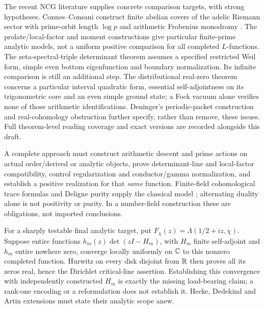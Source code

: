 The recent NCG literature supplies concrete comparison targets, with strong hypotheses. Connes--Consani construct finite abelian covers of the adelic Riemann sector with prime-orbit length $\log p$ and arithmetic Frobenius monodromy \cite[Theorem3.12]{ConnesConsaniKnots}. The prolate/local-factor and moment constructions \cite{Prolate,LocalMoments} give particular finite-prime analytic models, not a uniform positive comparison for all completed $L$-functions. The zeta-spectral-triple determinant theorem \cite[Theorem5.10]{ZetaTriples} assumes a specified restricted Weil form, simple even bottom eigenfunction and boundary normalization. Its infinite comparison is still an additional step. The distributional real-zero theorem \cite[Theorem6.1]{QuadraticForms} concerns a particular interval quadratic form, essential self-adjointness on its trigonometric core and an even simple ground state; a Fock vacuum alone verifies none of those arithmetic identifications. Deninger's periodic-packet construction and real-cohomology obstruction \cite{DeningerPackets,DeningerReal} further specify, rather than remove, these issues. Full theorem-level reading coverage and exact versions are recorded alongside this draft.

A complete approach must construct arithmetic descent and prime actions on actual order/derived or analytic objects, prove determinant-line and local-factor compatibility, control regularization and conductor/gamma normalization, and establish a positive realization for that \emph{same} function. Finite-field cohomological trace formulas and Deligne purity supply the classical model \cite{DeligneWeilI,DeligneWeilII}; alternating duality alone is not positivity or purity. In a number-field construction these are obligations, not imported conclusions.

For a sharply testable final analytic target, put $F_\chi(z)=\Lambda(1/2+iz,\chi)$. Suppose entire functions $h_m(z)\det(zI-H_m)$, with $H_m$ finite self-adjoint and $h_m$ entire nowhere zero, converge locally uniformly on $\mathbb C$ to this nonzero completed function. Hurwitz on every disk disjoint from $\mathbb R$ then proves all its zeros real, hence the Dirichlet critical-line assertion. Establishing this convergence with independently constructed $H_m$ is exactly the missing load-bearing claim; a rank-one encoding or a reformulation does not establish it. Hecke, Dedekind and Artin extensions must state their analytic scope anew.

